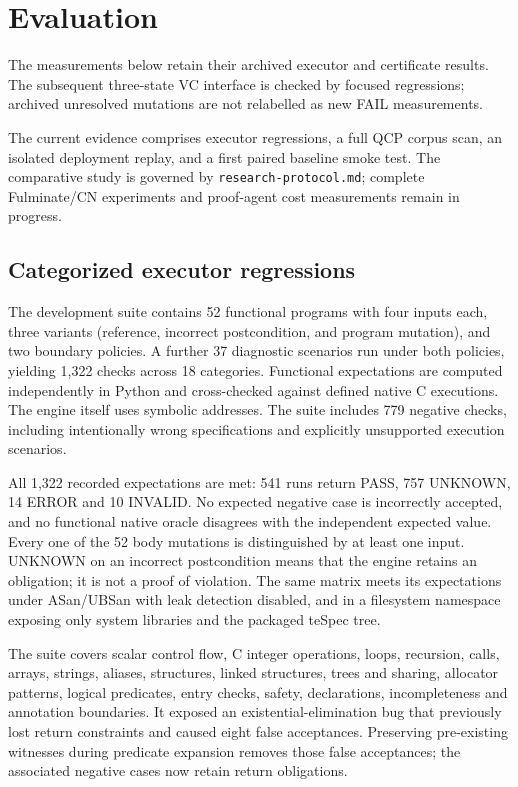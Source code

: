 \section{Evaluation}
The measurements below retain their archived executor and certificate results.
The subsequent three-state VC interface is checked by focused regressions;
archived unresolved mutations are not relabelled as new FAIL measurements.
\label{sec:evaluation}

The current evidence comprises executor regressions, a full QCP corpus scan,
an isolated deployment replay, and a first paired baseline smoke test. The
comparative study is governed by \texttt{research-protocol.md}; complete
Fulminate/CN experiments and proof-agent cost measurements remain in progress.

\subsection{Categorized executor regressions}

The development suite contains 52 functional programs with four inputs each,
three variants (reference, incorrect postcondition, and program mutation),
and two boundary policies. A further 37 diagnostic scenarios run under both
policies, yielding 1,322 checks across 18 categories. Functional expectations
are computed independently in Python and cross-checked against defined native
C executions. The engine itself uses symbolic addresses. The suite includes
779 negative checks, including intentionally wrong specifications and explicitly
unsupported execution scenarios.

All 1,322 recorded expectations are met: 541 runs return PASS, 757 UNKNOWN,
14 ERROR and 10 INVALID. No expected negative case is incorrectly accepted,
and no functional native oracle disagrees with the independent expected value.
Every one of the 52 body mutations is distinguished by at least one input.
UNKNOWN on an incorrect postcondition means that the engine retains an
obligation; it is not a proof of violation. The same matrix meets its
expectations under ASan/UBSan with leak detection disabled, and in a filesystem
namespace exposing only system libraries and the packaged teSpec tree.

The suite covers scalar control flow, C integer operations, loops, recursion,
calls, arrays, strings, aliases, structures, linked structures, trees and
sharing, allocator patterns, logical predicates, entry checks, safety,
declarations, incompleteness and annotation boundaries. It exposed an
existential-elimination bug that previously lost return constraints and caused
eight false acceptances. Preserving pre-existing witnesses during predicate
expansion removes those false acceptances; the associated negative cases now
retain return obligations.

